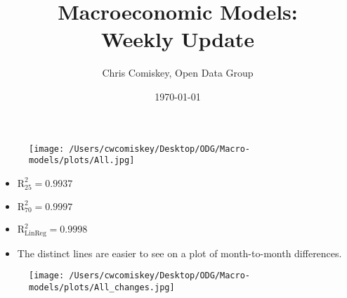 \documentclass{article}
\title{Macroeconomic Models: \\ Weekly Update}
\author{Chris Comiskey, Open Data Group}
\date{\today}
\begin{document}
\maketitle{}
    \begin{figure}[H]
    \centering
    \texttt{[image: /Users/cwcomiskey/Desktop/ODG/Macro-models/plots/All.jpg]}
    \end{figure}
\begin{itemize}
\item $\text{R}^{2}_{25} = 0.9937$
\item $\text{R}^{2}_{70} = 0.9997$
\item $\text{R}^{2}_{\text{LinReg}} = 0.9998$
\end{itemize}

\begin{itemize}
\item The distinct lines are easier to see on a plot of month-to-month differences.
\end{itemize}
    \begin{figure}[H]
    \centering
    \texttt{[image: /Users/cwcomiskey/Desktop/ODG/Macro-models/plots/All\_changes.jpg]}
    \end{figure}
\end{document}
